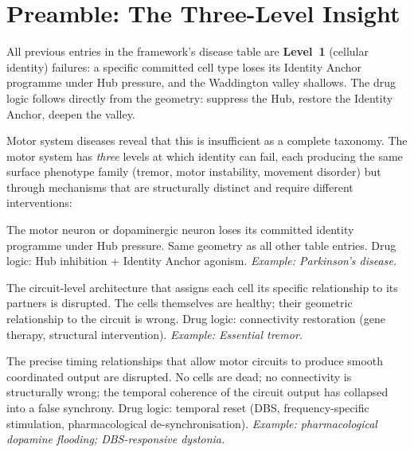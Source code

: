 \documentclass[12pt,a4paper]{article}
\newcommand{\Lev}[1]{\textbf{Level~#1}}
\begin{document}
\section{Preamble: The Three-Level Insight}

All previous entries in the framework's disease table are
\Lev{1} (cellular identity) failures: a specific committed cell type
loses its Identity Anchor programme under Hub pressure, and the
Waddington valley shallows. The drug logic follows directly from the
geometry: suppress the Hub, restore the Identity Anchor, deepen the
valley.

Motor system diseases reveal that this is insufficient as a complete
taxonomy. The motor system has \textit{three} levels at which identity
can fail, each producing the same surface phenotype family (tremor, motor
instability, movement disorder) but through mechanisms that are structurally
distinct and require different interventions:

\begin{description}[leftmargin=2em, itemsep=0.5em]
  \item[\Lev{1} --- Cellular identity:] The motor neuron or dopaminergic
    neuron loses its committed identity programme under Hub pressure.
    Same geometry as all other table entries. Drug logic: Hub inhibition +
    Identity Anchor agonism. \textit{Example: Parkinson's disease.}

  \item[\Lev{2} --- Connectivity identity:] The circuit-level architecture
    that assigns each cell its specific relationship to its partners is
    disrupted. The cells themselves are healthy; their geometric relationship
    to the circuit is wrong. Drug logic: connectivity restoration (gene
    therapy, structural intervention). \textit{Example: Essential tremor.}

  \item[\Lev{3} --- Temporal identity:] The precise timing relationships
    that allow motor circuits to produce smooth coordinated output are
    disrupted. No cells are dead; no connectivity is structurally wrong;
    the temporal coherence of the circuit output has collapsed into a
    false synchrony. Drug logic: temporal reset (DBS, frequency-specific
    stimulation, pharmacological de-synchronisation).
    \textit{Example: pharmacological dopamine flooding; DBS-responsive
    dystonia.}
\end{description}
\end{document}
